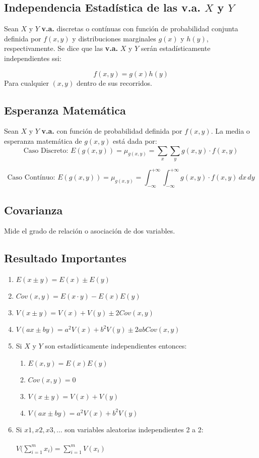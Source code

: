\subsection{Independencia Estadística de las v.a. $X$ y $Y$}
Sean $X$ y $Y$ \textbf{v.a.} discretas o contínuas con función de probabilidad conjunta definida por $f(x,y)$ y distribuciones marginales $g(x)$ y $h(y)$, respectivamente. Se dice que las \textbf{v.a.} $X$ y $Y$ serán estadísticamente independientes ssi:

$$f(x,y)=g(x)h(y)$$
Para cualquier $(x,y)$ dentro de sus recorridos.
\subsection{Esperanza Matemática}
Sean $X$ y $Y$ \textbf{v.a.} con función de probabilidad definida por $f(x,y)$. La media o esperanza matemática de $g(x,y)$ está dada por:
$$
\text{Caso Discreto: }
E(g(x,y))=\mu_{g(x,y)}=\displaystyle\sum_{x}\displaystyle\sum_{y} g(x,y)\cdot f(x,y)
$$

$$
\text{Caso Contínuo: }
E(g(x,y))=\mu_{g(x,y)}=\displaystyle\int_{-\infty}^{+\infty}\displaystyle\int_{-\infty}^{+\infty} g(x,y)\cdot f(x,y) \,dx \,dy
$$
\subsection{Covarianza}
Mide el grado de relación o asociación de dos variables.
\subsection{Resultado Importantes}
\begin{enumerate}
\item $E(x\pm y)=E(x)\pm E(y)$
\item $Cov(x,y)=E(x\cdot y) - E(x)E(y)$
\item $V(x\pm y)=V(x)+V(y)\pm 2Cov(x,y)$
\item $V(ax\pm by)=a^2 V(x)+b^2V(y)\pm 2abCov(x,y)$
\item Si $X$ y $Y$ son estadísticamente independientes entonces:
\begin{enumerate}
\item $E(x,y)=E(x)E(y)$
\item $Cov(x,y)=0$
\item $V(x\pm y)=V(x)+V(y)$
\item $V(ax\pm by)=a^2V(x)+b^2V(y)$

\end{enumerate}
\item Si $x1,x2,x3,\ldots$ son variables aleatorias independientes 2 a 2:\\ \vspace{0.025cm} \\
$V\Bigg( \displaystyle\sum_{i=1}^{m} x_i \Bigg) = \displaystyle\sum_{i=1}^{m} V(x_i)$
\end{enumerate}